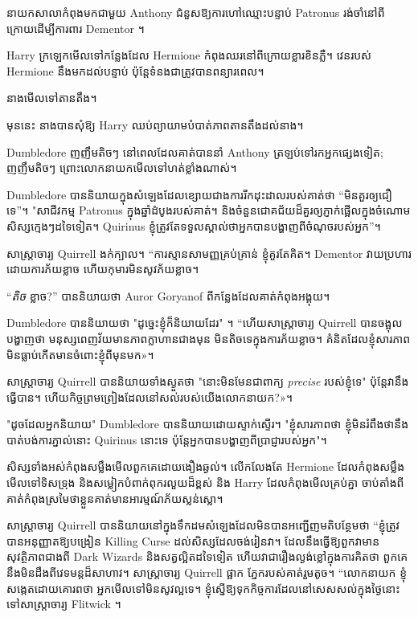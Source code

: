 នាយកសាលាកំពុងមកជាមួយ Anthony ជំនួសឱ្យការហៅឈ្មោះបន្ទាប់ Patronus រង់ចាំនៅពីក្រោយដើម្បីការពារ Dementor ។

Harry ក្រឡេកមើលទៅកន្លែងដែល Hermione កំពុងឈរនៅពីក្រោយខ្លារខិនភ្លឺ។ វេនរបស់ Hermione នឹងមកដល់បន្ទាប់ ប៉ុន្តែទំនងជាត្រូវបានពន្យារពេល។

នាងមើលទៅតានតឹង។

មុន​នេះ នាង​បាន​សុំ​ឱ្យ Harry ឈប់​ព្យាយាម​បំបាត់​ភាព​តានតឹង​ដល់​នាង។

Dumbledore ញញឹមតិចៗ នៅពេលដែលគាត់បាននាំ Anthony ត្រឡប់ទៅរកអ្នកផ្សេងទៀត; ញញឹមតិចៗ ព្រោះលោកនាយកមើលទៅហត់ខ្លាំងណាស់។

Dumbledore បាន​និយាយ​ក្នុង​សំឡេង​ដែល​ខ្សោយ​ជាង​ការ​រីក​ដុះដាល​របស់​គាត់​ថា “មិន​គួរ​ឲ្យ​ជឿ​ទេ”។ "សាជីវកម្ម Patronus ក្នុងឆ្នាំដំបូងរបស់គាត់។ និង​ចំនួន​ជោគជ័យ​ដ៏​គួរ​ឲ្យ​ភ្ញាក់ផ្អើល​ក្នុង​ចំណោម​សិស្ស​ក្មេងៗ​ដទៃ​ទៀត។ Quirinus ខ្ញុំត្រូវតែទទួលស្គាល់ថាអ្នកបានបង្ហាញពីចំណុចរបស់អ្នក”។

សាស្ត្រាចារ្យ Quirrell ងក់ក្បាល។ “ការស្មានសាមញ្ញគ្រប់គ្រាន់ ខ្ញុំគួរតែគិត។ Dementor វាយប្រហារដោយការភ័យខ្លាច ហើយកុមារមិនសូវភ័យខ្លាច។

“\emph{តិច} ខ្លាច?” បាននិយាយថា Auror Goryanof ពីកន្លែងដែលគាត់កំពុងអង្គុយ។

Dumbledore បាននិយាយថា "ដូច្នេះខ្ញុំក៏និយាយដែរ" ។ “ហើយសាស្រ្តាចារ្យ Quirrell បានចង្អុលបង្ហាញថា មនុស្សពេញវ័យមានភាពក្លាហានជាងមុន មិនតិចទេក្នុងការភ័យខ្លាច។ គំនិត​ដែល​ខ្ញុំ​សារភាព មិន​ធ្លាប់​កើត​មាន​ចំពោះ​ខ្ញុំ​ពី​មុន​មក»។

សាស្ត្រាចារ្យ Quirrell បាននិយាយទាំងស្ងួតថា "នោះមិនមែនជាពាក្យ \emph{precise} របស់ខ្ញុំទេ" ប៉ុន្តែវានឹងធ្វើបាន។ ហើយ​កិច្ច​ព្រម​ព្រៀង​ដែល​នៅ​សល់​របស់​យើង​លោក​នាយក​?»។

"ដូចដែលអ្នកនិយាយ" Dumbledore បាននិយាយដោយស្ទាក់ស្ទើរ។ "ខ្ញុំសារភាពថា ខ្ញុំមិនរំពឹងថានឹងបាត់បង់ការភ្នាល់នោះ Quirinus នោះទេ ប៉ុន្តែអ្នកបានបង្ហាញពីប្រាជ្ញារបស់អ្នក"។

សិស្សទាំងអស់កំពុងសម្លឹងមើលពួកគេដោយងឿងឆ្ងល់។ លើក​លែង​តែ Hermione ដែល​កំពុង​សម្លឹង​មើល​ទៅ​ទិស​ទ្រុង និង​សម្លៀក​បំពាក់​ពុក​រលួយ​ដ៏​ខ្ពស់ និង Harry ដែលកំពុងមើលគ្រប់គ្នា ចាប់តាំងពីគាត់កំពុងស្រមៃថាខ្លួនគាត់មានអារម្មណ៍ភ័យស្លន់ស្លោ។

សាស្ត្រាចារ្យ Quirrell បាននិយាយនៅក្នុងទឹកដមសំឡេងដែលមិនបានអញ្ជើញមតិបន្ថែមថា “ខ្ញុំត្រូវបានអនុញ្ញាតឱ្យបង្រៀន Killing Curse ដល់សិស្សដែលចង់រៀនវា។ ដែលនឹងធ្វើឱ្យពួកវាមានសុវត្ថិភាពជាងពី Dark Wizards និងសត្វល្អិតដទៃទៀត ហើយវាជារឿងល្ងង់ខ្លៅក្នុងការគិតថា ពួកគេនឹងមិនដឹងពីវេទមន្តដ៏សាហាវ។ សាស្រ្តាចារ្យ Quirrell ផ្អាក ភ្នែករបស់គាត់រួមតូច។ “លោកនាយក ខ្ញុំសង្កេតដោយគោរពថា អ្នកមើលទៅមិនសូវល្អទេ។ ខ្ញុំ​ស្នើ​ឱ្យ​ទុក​កិច្ចការ​ដែល​នៅ​សេសសល់​ក្នុង​ថ្ងៃ​នោះ​ទៅ​សាស្ត្រាចារ្យ Flitwick ។

